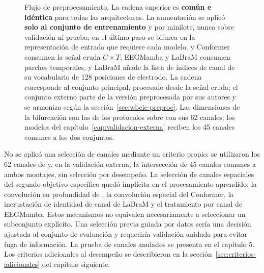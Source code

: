 \begin{figure}[htbp]
\caption{Flujo de preprocesamiento. La cadena superior es \textbf{común e idéntica}
para todas las arquitecturas. La aumentación se aplicó \textbf{solo al conjunto de
entrenamiento} y por minilote, nunca sobre validación ni prueba; en el último paso se bifurca en la representación de
entrada que requiere cada modelo. \eegnet{} y Conformer consumen la señal cruda
$C\times T$; EEGMamba y LaBraM consumen parches temporales, y LaBraM añade la lista
de índices de canal de su vocabulario de 128 posiciones de electrodo. La cadena corresponde al conjunto principal,
procesado desde la señal cruda; el conjunto externo parte de la versión preprocesada por
sus autores y se armoniza según la sección~\ref{sec:wbcic-preproc}. Las dimensiones de la
bifurcación son las de los protocolos sobre \openbmi{} con sus 62 canales; los modelos del
capítulo~\ref{cap:validacion-externa} reciben los 45 canales comunes a los dos conjuntos.}
\label{fig:pipeline}
\end{figure}

No se aplicó una selección de canales mediante un criterio propio: se utilizaron los
62 canales de \openbmi{} y, en la validación externa, la intersección de 45 canales
comunes a ambos montajes, sin selección por desempeño. La selección de canales espaciales
del segundo objetivo específico quedó implícita en el procesamiento aprendido: la
convolución en profundidad de \eegnet{}, la convolución espacial del Conformer, la
incrustación de identidad de canal de LaBraM y el tratamiento por canal de EEGMamba.
Estos mecanismos no equivalen necesariamente a seleccionar un subconjunto explícito.
Una selección previa guiada por datos sería una decisión ajustada al conjunto de
evaluación y requeriría validación anidada para evitar fuga de información. La prueba
de canales anulados se presenta en el capítulo 5. Los criterios adicionales al desempeño se describieron en la sección~\ref{sec:criterios-adicionales} del capítulo siguiente.


